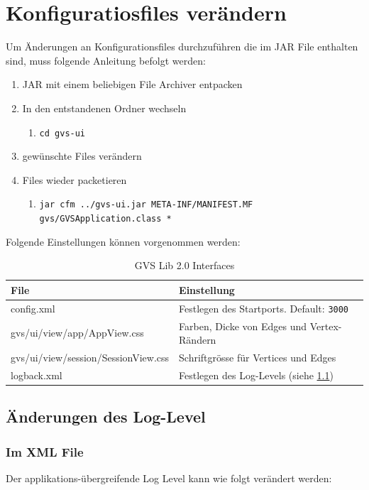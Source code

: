 \documentclass[11pt,a4paper,english,oneside]{book}
\numberwithin{equation}{chapter}
\begin{document}
	\clearpage
	
	\section{Konfiguratiosfiles verändern}
	Um Änderungen an Konfigurationsfiles durchzuführen die im JAR File enthalten sind, muss folgende Anleitung befolgt werden:
	
	\begin{enumerate}
		\item JAR mit einem beliebigen File Archiver entpacken
		\item In den entstandenen Ordner wechseln
		\begin{enumerate}
			\item \lstinline{cd gvs-ui}
		\end{enumerate}
		\item gewünschte Files verändern
		\item Files wieder packetieren
		\begin{enumerate}
			\item \lstinline{jar cfm ../gvs-ui.jar META-INF/MANIFEST.MF gvs/GVSApplication.class *}
		\end{enumerate}
	\end{enumerate}

	Folgende Einstellungen können vorgenommen werden:
	
		\begin{table}[h!]
		\centering
		\begin{tabularx}{\linewidth}{l X}
			\toprule 
			File & Einstellung \\
			\midrule
			config.xml & Festlegen des Startports. Default: \lstinline{3000} \\
			gvs/ui/view/app/AppView.css & Farben, Dicke von Edges und Vertex-Rändern\\
			gvs/ui/view/session/SessionView.css & Schriftgrösse für Vertices und Edges\\
			logback.xml & Festlegen des Log-Levels (siehe \ref{ssec:logger})\\
			\bottomrule 
		\end{tabularx} 
		\caption{GVS Lib 2.0 Interfaces} 
		\label{tbl:preferences}
	\end{table}
	
	\subsection{Änderungen des Log-Level} \label{ssec:logger}
	\subsubsection{Im XML File}
	Der applikations-übergreifende Log Level kann wie folgt verändert werden:
	
\end{document}
